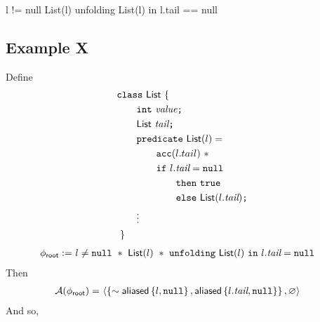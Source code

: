 %
l != null List(l) unfolding List(l) in l.tail == null

\subsection*{Example X}

\renewcommand{\int}{\ttt{int}}
\newcommand{\IntList}{\tsf{IntList}}
\newcommand{\List}{\tsf{List}}
\newcommand{\vvalue}{\tit{value}}
\newcommand{\vtail}{\tit{tail}}
\newcommand{\ctrue}{\ttt{true}}

Define
\begin{align*}
&\hspace{0em} \ttt{class} \ \List \ \{ \\
&\hspace{2em}   \int \ \vvalue \ttt{;} \\
&\hspace{2em}   \List \ \vtail \ttt{;} \\
&\hspace{2em}   \ttt{predicate} \ \List(l) = \\
&\hspace{4em}     \cacc(l.tail) \ \ast \\
&\hspace{4em}     \cif \ l.\vtail = \cnull \\
&\hspace{6em}       \cthen \ \ctrue \\
&\hspace{6em}       \celse \ \List(l.\vtail)
                \ttt{;} \\
&\hspace{2em} \vdots \\
&\hspace{0em} \ \}
\end{align*}
%
\begin{align*}
\phiroot := & \
l \neq \cnull \ \ast \
\List(l) \ \ast \
\cunfolding \ \List(l) \ \cin \ l.\vtail = \cnull
\end{align*}
Then
\begin{align*}
\A(\phiroot) = & \
\context
  { \set{ \pnot \aliased\set{l, \cnull}, \aliased\set{l.\vtail, \cnull} } }
  { \empty }
\end{align*}
And so,
